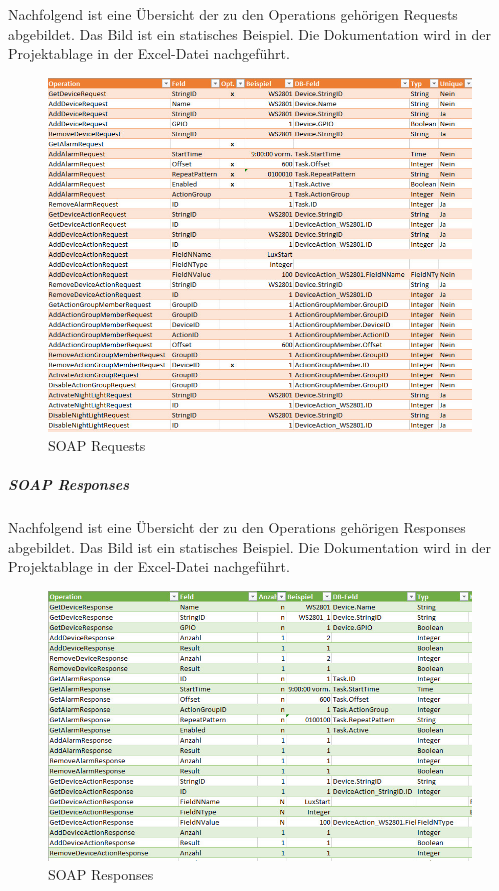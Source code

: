 \documentclass[]{article}
\let\oldsubparagraph\subparagraph
\renewcommand{\subparagraph}[1]{\oldsubparagraph{#1}\mbox{}}
\begin{document}
Nachfolgend ist eine Übersicht der zu den Operations gehörigen Requests
abgebildet. Das Bild ist ein statisches Beispiel. Die Dokumentation wird
in der Projektablage in der Excel-Datei nachgeführt.
\begin{figure}[H]
\centering
\includegraphics{./WI27_WebService_Definition_Requests.jpeg}
\caption{SOAP Requests}
\end{figure}

\subparagraph{SOAP Responses}\label{soap-responses}

Nachfolgend ist eine Übersicht der zu den Operations gehörigen Responses
abgebildet. Das Bild ist ein statisches Beispiel. Die Dokumentation wird
in der Projektablage in der Excel-Datei nachgeführt.
\begin{figure}[H]
\centering
\includegraphics{./WI27_WebService_Definition_Responses.jpeg}
\caption{SOAP Responses}
\end{figure}
\end{document}
